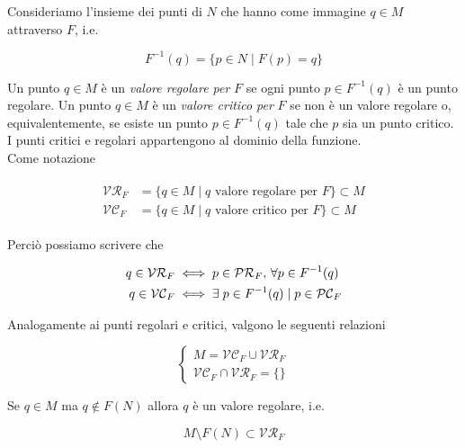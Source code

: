 Consideriamo l'insieme dei punti di $ N $ che hanno come immagine $ q \in M $ attraverso $ F $, i.e.

\begin{equation}
	F^{-1}(q) = \{ p \in N \mid F(p) = q \}
\end{equation}

Un punto $ q \in M $ è un \textit{valore regolare per} $ F $ se ogni punto $ p \in F^{-1}(q) $ è un punto regolare. Un punto $ q \in M $ è un \textit{valore critico per} $ F $ se non è un valore regolare o, equivalentemente, se esiste un punto $ p \in F^{-1}(q) $ tale che $ p $ sia un punto critico.\\
I punti critici e regolari appartengono al dominio della funzione.\\
Come notazione

\begin{align}
	\begin{split}
		\mathcal{VR}_{F} &= \{ q \in M \mid q \text{ valore regolare per } F \} \subset M\\
		\mathcal{VC}_{F} &= \{ q \in M \mid q \text{ valore critico per } F \} \subset M
	\end{split}
\end{align}

Perciò possiamo scrivere che

\begin{align}
	\begin{split}
		q \in \mathcal{VR}_{F} &\iff p \in \mathcal{PR}_{F}, \, \forall p \in F^{-1}(q)\\
		q \in \mathcal{VC}_{F} &\iff \exists \; p \in F^{-1}(q) \mid p \in \mathcal{PC}_{F}
	\end{split}
\end{align}

Analogamente ai punti regolari e critici, valgono le seguenti relazioni

\begin{equation}
	\begin{cases}
		M = \mathcal{VC}_{F} \cup \mathcal{VR}_{F}\\
		\mathcal{VC}_{F} \cap \mathcal{VR}_{F} = \{\}
	\end{cases}
\end{equation}

\begin{remark}
	Se $ q \in M $ ma $ q \notin F(N) $ allora $ q $ è un valore regolare, i.e.
	
	\begin{equation}
		M \setminus F(N) \subset \mathcal{VR}_{F}
	\end{equation}
\end{remark}

